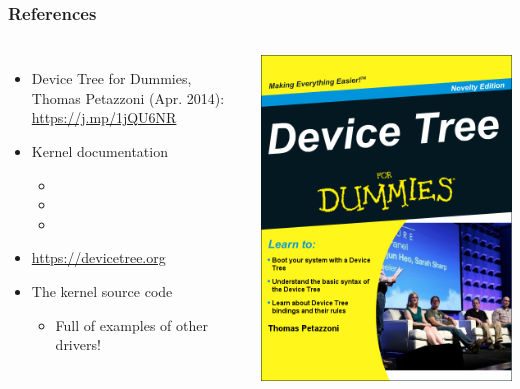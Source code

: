\begin{frame}
  \frametitle{References}
  \begin{columns}
       \begin{itemize}
       \item Device Tree for Dummies, Thomas Petazzoni (Apr. 2014):
             \url{https://j.mp/1jQU6NR}
       \item Kernel documentation
         \begin{itemize}
         \item {}
         \item {}
         \item {}
         \end{itemize}
      \item \url{https://devicetree.org}
       \item The kernel source code
         \begin{itemize}
         \item Full of examples of other drivers!
         \end{itemize}
       \end{itemize}
    \includegraphics[height=0.8\textheight]{slides/kernel-device-model/device-tree-for-dummies.png}
  \end{columns}
\end{frame}

